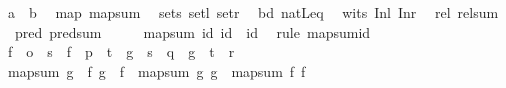 \begin{isabellebody}
\endisatagproof
{\isafoldproof}%
%
\isadelimproof
\isanewline
%
\endisadelimproof
\isanewline
{}\isamarkupfalse%
\ {\isachardoublequoteopen}{\isacharprime}{\kern0pt}a\ {\isacharplus}{\kern0pt}\ {\isacharprime}{\kern0pt}b{\isachardoublequoteclose}\isanewline
\ \ map{\isacharcolon}{\kern0pt}\ map{\isacharunderscore}{\kern0pt}sum\isanewline
\ \ sets{\isacharcolon}{\kern0pt}\ setl\ setr\isanewline
\ \ bd{\isacharcolon}{\kern0pt}\ natLeq\isanewline
\ \ wits{\isacharcolon}{\kern0pt}\ Inl\ Inr\isanewline
\ \ rel{\isacharcolon}{\kern0pt}\ rel{\isacharunderscore}{\kern0pt}sum\isanewline
\ \ pred{\isacharcolon}{\kern0pt}\ pred{\isacharunderscore}{\kern0pt}sum\isanewline
%
\isadelimproof
%
\endisadelimproof
%
\isatagproof
{}\isamarkupfalse%
\ {\isacharminus}{\kern0pt}\isanewline
\ \ \isamarkupfalse%
\ {\isachardoublequoteopen}map{\isacharunderscore}{\kern0pt}sum\ id\ id\ {\isacharequal}{\kern0pt}\ id{\isachardoublequoteclose}\ \isamarkupfalse%
\ {\isacharparenleft}{\kern0pt}rule\ map{\isacharunderscore}{\kern0pt}sum{\isachardot}{\kern0pt}id{\isacharparenright}{\kern0pt}\isanewline
{}\isamarkupfalse%
\isanewline
\ \ \isamarkupfalse%
\ f{}\ {\isacharcolon}{\kern0pt}{\isacharcolon}{\kern0pt}\ {\isachardoublequoteopen}{\isacharprime}{\kern0pt}o\ {\isasymRightarrow}\ {\isacharprime}{\kern0pt}s{\isachardoublequoteclose}\ \ f{}\ {\isacharcolon}{\kern0pt}{\isacharcolon}{\kern0pt}\ {\isachardoublequoteopen}{\isacharprime}{\kern0pt}p\ {\isasymRightarrow}\ {\isacharprime}{\kern0pt}t{\isachardoublequoteclose}\ \ g{}\ {\isacharcolon}{\kern0pt}{\isacharcolon}{\kern0pt}\ {\isachardoublequoteopen}{\isacharprime}{\kern0pt}s\ {\isasymRightarrow}\ {\isacharprime}{\kern0pt}q{\isachardoublequoteclose}\ \ g{}\ {\isacharcolon}{\kern0pt}{\isacharcolon}{\kern0pt}\ {\isachardoublequoteopen}{\isacharprime}{\kern0pt}t\ {\isasymRightarrow}\ {\isacharprime}{\kern0pt}r{\isachardoublequoteclose}\isanewline
\ \ \isamarkupfalse%
\ {\isachardoublequoteopen}map{\isacharunderscore}{\kern0pt}sum\ {\isacharparenleft}{\kern0pt}g{}\ {\isasymcirc}\ f{}{\isacharparenright}{\kern0pt}\ {\isacharparenleft}{\kern0pt}g{}\ {\isasymcirc}\ f{}{\isacharparenright}{\kern0pt}\ {\isacharequal}{\kern0pt}\ map{\isacharunderscore}{\kern0pt}sum\ g{}\ g{}\ {\isasymcirc}\ map{\isacharunderscore}{\kern0pt}sum\ f{}\ f{}{\isachardoublequoteclose}\isanewline

\end{isabellebody}
